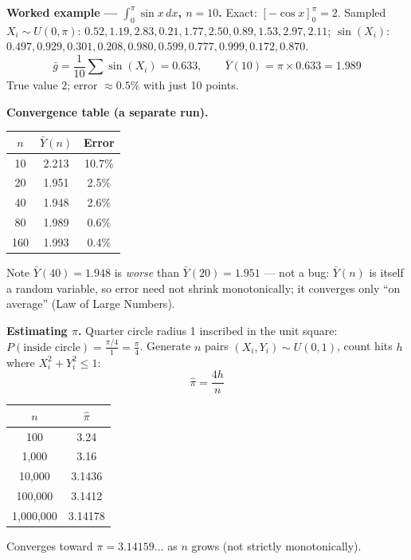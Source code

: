 \begin{examplebox}
\textbf{Worked example — $\int_0^\pi \sin x\,dx$, $n=10$.} Exact: $[-\cos x]_0^\pi = 2$. Sampled $X_i\sim U(0,\pi)$: $0.52,1.19,2.83,0.21,1.77,2.50,0.89,1.53,2.97,2.11$; $\sin(X_i)$: $0.497,0.929,0.301,0.208,0.980,0.599,0.777,0.999,0.172,0.870$.
\[
\bar g = \frac{1}{10}\sum \sin(X_i) = 0.633, \qquad \bar Y(10) = \pi\times0.633 = 1.989
\]
True value $2$; error $\approx0.5\%$ with just 10 points.

\textbf{Convergence table (a separate run).}
\begin{center}\small
\begin{tabular}{@{}ccc@{}}
\toprule
$n$ & $\bar Y(n)$ & Error\\
\midrule
10 & 2.213 & 10.7\%\\
20 & 1.951 & 2.5\%\\
40 & 1.948 & 2.6\%\\
80 & 1.989 & 0.6\%\\
160 & 1.993 & 0.4\%\\
\bottomrule
\end{tabular}
\end{center}
Note $\bar Y(40)=1.948$ is \emph{worse} than $\bar Y(20)=1.951$ — not a bug: $\bar Y(n)$ is itself a random variable, so error need not shrink monotonically; it converges only ``on average'' (Law of Large Numbers).
\end{examplebox}

\begin{examplebox}
\textbf{Estimating $\pi$.} Quarter circle radius 1 inscribed in the unit square: $P(\text{inside circle}) = \frac{\pi/4}{1}=\frac{\pi}{4}$. Generate $n$ pairs $(X_i,Y_i)\sim U(0,1)$, count hits $h$ where $X_i^2+Y_i^2\le1$:
\[
\hat\pi = \frac{4h}{n}
\]
\begin{center}\small
\begin{tabular}{@{}cc@{}}
\toprule
$n$ & $\hat\pi$\\
\midrule
100 & 3.24\\
1{,}000 & 3.16\\
10{,}000 & 3.1436\\
100{,}000 & 3.1412\\
1{,}000{,}000 & 3.14178\\
\bottomrule
\end{tabular}
\end{center}
Converges toward $\pi=3.14159\ldots$ as $n$ grows (not strictly monotonically).
\end{examplebox}

